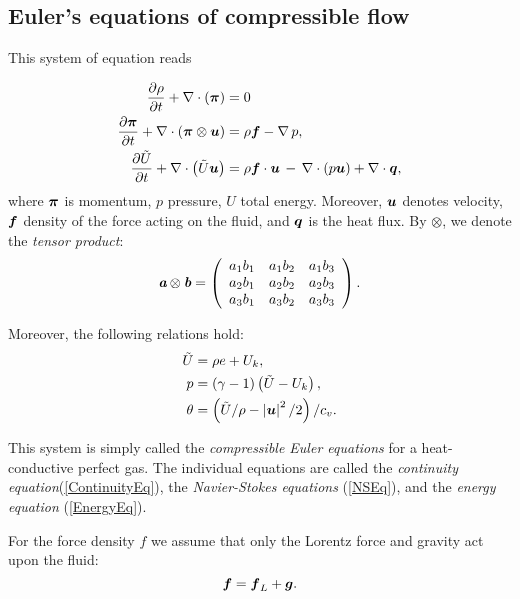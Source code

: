 \subsection{Euler's equations of compressible flow}
\label{subsec:euler}
This system of equation reads

\begin{align}
\label{ContinuityEq} \frac{\partial{\rho}}{\partial{t}} + \nabla\cdot\left(\mbox{\boldmath $\pi$}\right) & =  0\\
\label{NSEq} \frac{\partial{\mbox{\boldmath $\pi$}}}{\partial{t}} + \nabla\cdot\left(\mbox{\boldmath $\pi$}\otimes\mbox{\boldmath $u$}\right)& =  \rho\mbox{\boldmath $f$} - \nabla\,p,\\
\label{EnergyEq} \frac{\partial{\tilde{U}}}{\partial{t}} + \nabla\cdot\left({\tilde{U}}\mbox{\boldmath $u$}\right) & =  \rho\mbox{\boldmath $f$}\cdot\mbox{\boldmath $u$} \,-\,\nabla\cdot\left({p}\mbox{\boldmath $u$}\right) + \nabla\cdot\mbox{\boldmath $q$},
\end{align}
where $\mbox{\boldmath $\pi$}$ is momentum, $p$ pressure, $U$ total energy. Moreover, $\mbox{\boldmath $u$}$ denotes velocity, $\mbox{\boldmath $f$}$ density of the force acting on the fluid, and $\mbox{\boldmath $q$}$ is the heat flux. By $\otimes$, we denote the \textit{tensor product}:
\begin{displaymath}
\textit{\textbf{a}}\otimes\textit{\textbf{b}} =
\left(
\begin{array}{ccc}
a_1b_1 & a_1b_2 & a_1b_3 \\
a_2b_1 & a_2b_2 & a_2b_3 \\
a_3b_1 & a_3b_2 & a_3b_3
\end{array}
\right).
\end{displaymath}

Moreover, the following relations hold:
\begin{align}
\tilde{U} & =  \rho e + U_k,\\
p & =  \left({}\gamma-1\right)\left({\tilde{U}}-U_k\right), \label{therm_1}\\
\theta & =  \left({\tilde{U}}/{\rho}-\left|\mbox{\boldmath $u$}\right|^2/2\right)/{c_v}.
\end{align}

This system is simply called the \textit{compressible Euler equations} for a heat-conductive perfect gas. The individual equations are called the \textit{continuity equation}(\cref{ContinuityEq}), the \textit{Navier-Stokes equations} (\cref{NSEq}), and the \textit{energy equation} (\cref{EnergyEq}).

For the force density $f$ we assume that only the Lorentz force and gravity act upon the fluid:
$$
\label{ForceEq} \mbox{\boldmath $f$} = \mbox{\boldmath $f$}_L + \mbox{\boldmath $g$}.
$$



